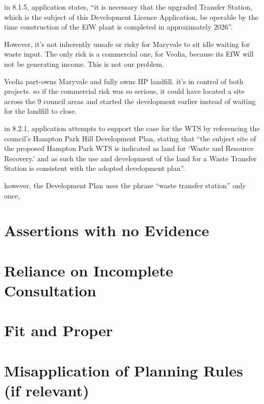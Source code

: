 \documentclass{article}
\begin{document}
in 8.1.5, application states, “it is necessary that the upgraded Transfer Station, which is the subject of this Development Licence Application, be operable by the time construction of the EfW plant is completed in approximately 2026”.

However, it's not inherently unsafe or risky for Maryvale to sit idle waiting for waste input. The only risk is a commercial one, for Veolia, because its EfW will not be generating income. This is not our problem.

Veolia part-owns Maryvale and fully owns HP landfill. it's in control of both projects. so if the commercial risk was so serious, it could have located a site across the 9 council areas and started the development earlier instead of waiting for the landfill to close.


in 8.2.1, application attempts to support the case for the WTS by referencing the council’s Hampton Park Hill Development Plan, stating that “the subject site of the proposed Hampton Park WTS is indicated as land for ‘Waste and Resource Recovery.’ and as such the use and development of the land for a Waste Transfer Station is consistent with the adopted development plan”.

however, the Development Plan uses the phrase “waste transfer station” only once,

\section{Assertions with no Evidence}

\section{Reliance on Incomplete Consultation}

\section{Fit and Proper}

\section{Misapplication of Planning Rules (if relevant)}



\printbibliography
\end{document}
